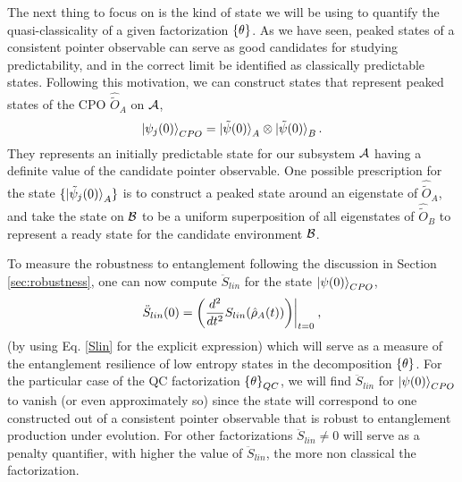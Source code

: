 \documentclass[aps,pra,onecolumn,nofootinbib,12pt,tightenlines]{revtex4-1}
\begin{document}
The next thing to focus on is the kind of state we will be using to quantify the quasi-classicality of a given factorization ${\{\theta\}}$. As we have seen, peaked states of a consistent pointer observable can serve as good candidates for studying predictability, and in the correct limit be identified as classically predictable states.
Following this motivation, we can construct states that represent peaked states of the CPO $\hat{\tilde{O}}_{A}$ on $\mathcal{A}$, 
\begin{equation}
\ket{\psi_{j}(0)}_{CPO} = \ket{\tilde{\psi} (0)}_{A} \otimes \ket{\tilde{\psi} (0)}_{B}. 
\end{equation}
They represents an initially predictable state for our subsystem $\mathcal{A}$ having a definite value of the candidate pointer observable. One possible prescription for the state $\{\ket{\tilde{\psi}_{j} (0)}_{A}\}$ is to construct a peaked state around an eigenstate of $\hat{\tilde{O}}_{A}$, and take the state on $\mathcal{B}$ to be a uniform superposition of all eigenstates of $\hat{\tilde{O}}_{B}$ to represent a ready state for the candidate environment $\mathcal{B}$. 

{To measure the robustness to entanglement following the discussion in Section \ref{sec:robustness}, one can now compute $\ddot{S}_{lin}$ for the state $\ket{\psi(0)}_{CPO}$,
\begin{equation}
 \ddot{S}_{lin}(0)  =  \bigg(\frac{d^{2}}{dt^{2}}S_{lin}(\oprho_{A}(t)) \bigg)\bigg|_{t=0} \: ,
\end{equation}
(by using Eq. \ref{Slin} for the explicit expression) which will serve as a measure of the entanglement resilience of low entropy states in the decomposition ${\{\theta\}}$.} For the particular case of the QC factorization ${\{\theta\}}_{QC}$, we will find $\ddot{S}_{lin}$ for $\ket{\psi(0)}_{CPO}$ to  {vanish} (or even approximately so) since the state will correspond to one constructed out of a consistent pointer observable that is robust to entanglement production under evolution. For other factorizations $\ddot{S}_{lin} \neq 0$ will serve as a penalty quantifier, with higher the value of $\ddot{S}_{lin}$, the more non classical the factorization. 
\end{document}
